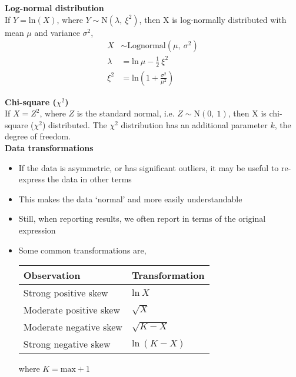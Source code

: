 \documentclass[a4paper]{article}
\newcommand{\heading}[1]{{\small\textbf{#1}}}
\newcommand{\subheading}[1]{{\scriptsize\textbf{#1}}}
\begin{document}
\begin{multicols*}{4}
\subheading{Log-normal distribution}\\
If $Y = \mathrm{ln}(X)$, where $Y\sim \mathrm{N}(\lambda,\ \xi^2)$, 
then X is log-normally distributed with mean $\mu$ and variance 
$\sigma^2$,
\begin{align*}
    X       &\sim \text{Lognormal}(\mu,\ \sigma^2)\\
    \lambda &= \mathrm{ln}\ \mu - \frac{1}{2}\ \xi^2\\
    \xi^2   &= \mathrm{ln}\left ( 1 + \frac{\sigma^2}{\mu^2} \right )
\end{align*}

\subheading{Chi-square ($\chi^2$)}\\
If $X = Z^2$, where $Z$ is the standard normal, i.e. 
$Z\sim \mathrm{N}(0,\ 1)$, then X is chi-square ($\chi^2$) distributed.
The $\chi^2$ distribution has an additional parameter $k$, the degree of
freedom. \\

\heading{Data transformations}
\begin{itemize} \itemsep -0.5em
    \item If the data is asymmetric, or has significant outliers, it may
        be useful to re-express the data in other terms
    \item This makes the data `normal' and more easily understandable
    \item Still, when reporting results, we often report in terms of the
        original expression
    \item Some common transformations are,

    \begin{tabular}{|l|l|}
    \hline
    \textbf{Observation} & \textbf{Transformation} \\
    \hline
    Strong positive skew & $\mathrm{ln}\ X$ \\
    Moderate positive skew & $\sqrt{X} $ \\
    Moderate negative skew & $\sqrt{K-X} $ \\
    Strong negative skew & $\mathrm{ln}\ (K-X) $ \\
    \hline
    \end{tabular}

    where $K = \mathrm{max} + 1$
\end{itemize}


\end{multicols*}
\end{document}
